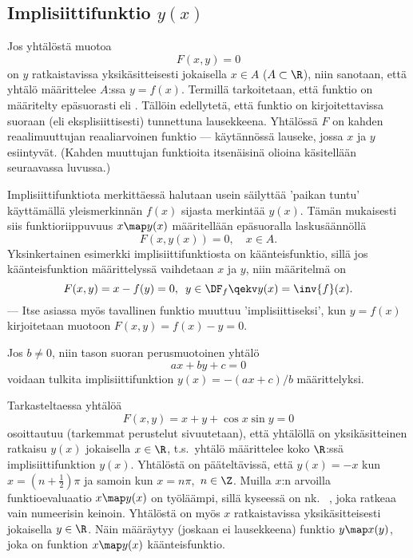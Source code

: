 \subsection*{Implisiittifunktio $y(x)$}

Jos yhtälöstä muotoa
\[
F(x,y)=0
\]
on $y$ ratkaistavissa yksikäsitteisesti jokaisella $x \in A$ ($A\subset\R$), niin
sanotaan, että yhtälö määrittelee $A$:ssa  $y=f(x)$. Termillä
tarkoitetaan, että funktio on määritelty epäsuorasti eli . Tällöin
 edellytetä, että funktio on kirjoitettavissa suoraan (eli eksplisiittisesti)
tunnettuna lausekkeena. Yhtälössä $F$ on kahden reaalimuuttujan reaaliarvoinen funktio --- 
käytännössä lauseke, jossa $x$ ja $y$ esiintyvät. (Kahden muuttujan funktioita itsenäisinä
olioina käsitellään seuraavassa luvussa.)

Implisiittifunktiota merkittäessä halutaan usein säilyttää 'paikan tuntu' käyttämällä
yleismerkinnän $f(x)$ sijasta merkintää $y(x)$. Tämän mukaisesti siis funktioriippuvuus
$x \map y(x)$ määritellään epäsuoralla laskusäännöllä
\[
F(x,y(x))=0, \quad x \in A.
\]
Yksinkertainen esimerkki implisiittifunktiosta on käänteisfunktio, sillä jos
käänteisfunktion määrittelyssä vaihdetaan $x$ ja $y$, niin määritelmä on
\[
F(x,y)=x-f(y)=0,\,\ y\in\DF_f \qekv y(x)=\inv{f}(x).
\]
--- Itse asiassa myös tavallinen funktio muuttuu 'implisiittiseksi', kun $y=f(x)$ 
kirjoitetaan muotoon $F(x,y)=f(x)-y=0$.
\begin{Exa} Jos $b \neq 0$, niin tason suoran perusmuotoinen yhtälö
\[
ax+by+c=0
\]
voidaan tulkita implisiittifunktion $y(x)=-(ax+c)/b$ määrittelyksi. \loppu
\end{Exa} 
\begin{Exa} \label{muuan implisiittifunktio} Tarkasteltaessa yhtälöä
\[
F(x,y)=x+y+\cos x\sin y=0
\]
osoittautuu (tarkemmat perustelut sivuutetaan), että yhtälöllä on yksikäsitteinen ratkaisu
$y(x)$ jokaisella $x\in\R$, t.s.\ yhtälö määrittelee koko $\R$:ssä implisiittifunktion $y(x)$.
Yhtälöstä on pääteltävissä, että $y(x)=-x$ kun $x=(n+\tfrac{1}{2})\pi$ ja samoin kun
$x=n\pi$, $\,n\in\Z$. Muilla $x$:n arvoilla funktioevaluaatio $x \map y(x)$ on työläämpi, sillä
kyseessä on nk.\ 
%
, joka ratkeaa vain numeerisin keinoin.
Yhtälöstä on myös $x$ ratkaistavissa yksikäsitteisesti jokaisella $y\in\R$. Näin määräytyy
(joskaan ei lausekkeena) funktio $y \map x(y)$, joka on funktion $x \map y(x)$ käänteisfunktio.
\loppu \end{Exa}

